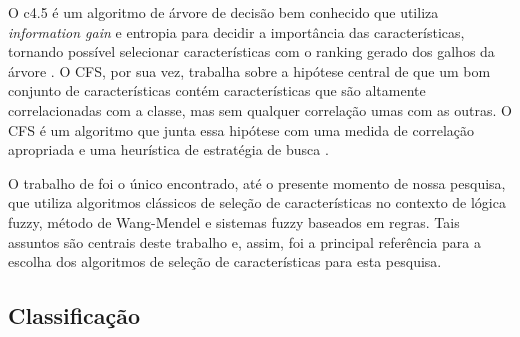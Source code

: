 \documentclass[template.tex]{subfiles}
\begin{document}
O c4.5 é um algoritmo de árvore de decisão bem conhecido que utiliza \textit{information gain} e entropia para decidir a importância das características, tornando possível selecionar características com o ranking gerado dos galhos da árvore \cite{salzberg1994c4}. 
O CFS, por sua vez, trabalha sobre a hipótese central de que um bom conjunto de características contém características que são altamente correlacionadas com a classe, mas sem qualquer correlação umas com as outras. O CFS é um algoritmo que junta essa hipótese com uma medida de correlação apropriada e uma heurística de estratégia de busca \cite{hall1999correlation}. 

O trabalho de  foi o único encontrado, até o presente momento de nossa pesquisa, que utiliza algoritmos clássicos de seleção de características no contexto de lógica fuzzy, método de Wang-Mendel e sistemas fuzzy baseados em regras. Tais assuntos são centrais deste trabalho e, assim,  foi a principal referência para a escolha dos algoritmos de seleção de características para esta pesquisa.

\subsection{Classificação}

%
%
%
%
%
\end{document}
